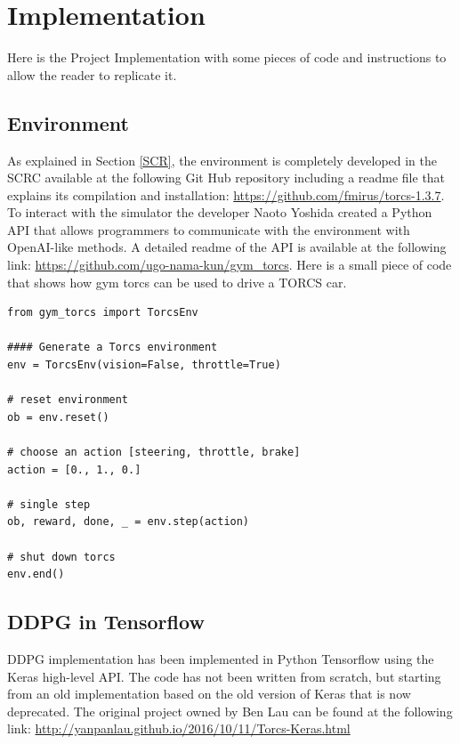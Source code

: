 \documentclass[Lau,oneside,noexaminfo]{sapthesis} %
\begin{document}
\chapter{Implementation}
Here is the Project Implementation with some pieces of code and instructions to allow the reader to replicate it.
\section{Environment}
As explained in Section \ref{SCR}, the environment is completely developed in the SCRC available at the following Git Hub repository including a readme file that explains its compilation and installation: \url{https://github.com/fmirus/torcs-1.3.7}.
To interact with the simulator the developer Naoto Yoshida created a Python API that allows programmers to communicate with the environment with OpenAI-like methods. A detailed readme of the API is available at the following link: \url{https://github.com/ugo-nama-kun/gym_torcs}.
Here is a small piece of code that shows how gym torcs can be used to drive a TORCS car.

\begin{lstlisting}
from gym_torcs import TorcsEnv

#### Generate a Torcs environment
env = TorcsEnv(vision=False, throttle=True)

# reset environment
ob = env.reset()

# choose an action [steering, throttle, brake]
action = [0., 1., 0.]

# single step
ob, reward, done, _ = env.step(action)

# shut down torcs
env.end()
\end{lstlisting}
\section{DDPG in Tensorflow}
DDPG implementation has been implemented in Python Tensorflow using the Keras high-level API. The code has not been written from scratch, but starting from an old implementation based on the old version of Keras that is now deprecated. The original project owned by Ben Lau can be found at the following link: \url{http://yanpanlau.github.io/2016/10/11/Torcs-Keras.html}
\end{document}
